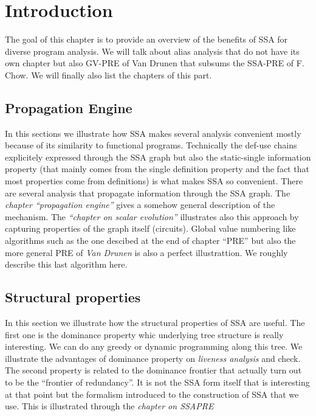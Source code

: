 \chapter{Introduction }

The goal of this chapter is to provide an overview of the benefits of SSA for diverse program analysis.
We will talk about alias analysis that do not have its own chapter but also GV-PRE of Van Drunen that subsums the SSA-PRE of F. Chow.
We will finally also list the chapters of this part.

\section{Propagation Engine}
In this sections we illustrate how SSA makes several analysis convenient mostly because of its similarity to functional programs. 
Technically the def-use chains explicitely expressed through the SSA graph but also the static-single information property (that mainly comes from the single definition property and the fact that most properties come from definitions) is what makes SSA so convenient.
There are several analysis that propagate information through the SSA graph.
The \emph{chapter ``propagation engine''} gives a somehow general description of the mechanism.
The \emph{``chapter on scalar evolution''} illustrates also this approach by capturing properties of the graph itself (circuits).
Global value numbering like algorithms such as the one descibed at the end of chapter ``PRE'' but also the more general PRE of \emph{Van Drunen} is also a perfect illustrattion.
We roughly describe this last algorithm here.

\section{Structural properties}
In this section we illustrate how the structural properties of SSA are useful.
The first one is the dominance property whic underlying tree structure is really interesting.
We can do any greedy or dynamic programming along this tree.
We illustrate the advantages of dominance property on \emph{liveness analysis} and check.
The second property is related to the dominance frontier that actually turn out to be the ``frontier of redundancy''.
It is not the SSA form itself that is interesting at that point but the formalism introduced to the construction of SSA that we use.
This is illustrated through the\emph{ chapter on SSAPRE}

